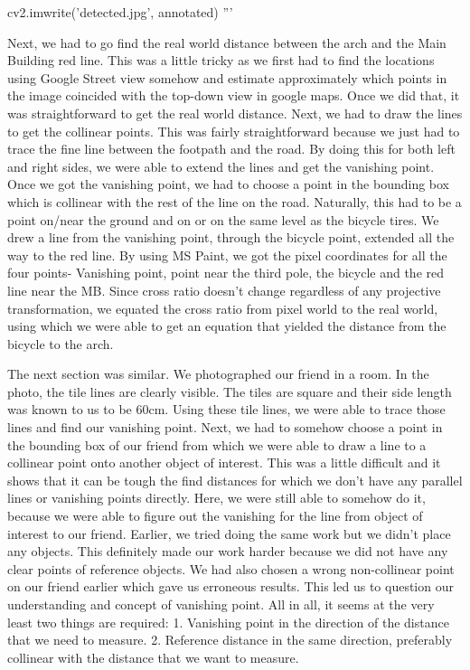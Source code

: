 cv2.imwrite('detected.jpg', annotated)
'''

Next, we had to go find the real world distance between the arch and the Main Building red line. This was a little tricky as we first had to find the locations using Google Street view somehow and estimate approximately which points in the image coincided with the top-down view in google maps.
Once we did that, it was straightforward to get the real world distance. 
Next, we had to draw the lines to get the collinear points. This was fairly straightforward because we just had to trace the fine line between the footpath and the road. By doing this for both left and right sides, we were able to extend the lines and get the vanishing point.
Once we got the vanishing point, we had to choose a point in the bounding box which is collinear with the rest of the line on the road. Naturally, this had to be a point on/near the ground and on or on the same level as the bicycle tires.
We drew a line from the vanishing point, through the bicycle point, extended all the way to the red line. By using MS Paint, we got the pixel coordinates for all the four points- Vanishing point, point near the third pole, the bicycle and the red line near the MB.
Since cross ratio doesn’t change regardless of any projective transformation, we equated the cross ratio from pixel world to the real world, using which we were able to get an equation that yielded the distance from the bicycle to the arch.

The next section was similar. We photographed our friend in a room. In the photo, the tile lines are clearly visible. The tiles are square and their side length was known to us to be 60cm.
Using these tile lines, we were able to trace those lines and find our vanishing point. Next, we had to somehow choose a point in the bounding box of our friend from which we were able to draw a line to a collinear point onto another object of interest. This was a little difficult and it shows that it can be tough the find distances for which we don’t have any parallel lines or vanishing points directly. Here, we were still able to somehow do it, because we were able to figure out the vanishing for the line from object of interest to our friend.
Earlier, we tried doing the same work but we didn’t place any objects. This definitely made our work harder because we did not have any clear points of reference objects.
We had also chosen a wrong non-collinear point on our friend earlier which gave us erroneous results. This led us to question our understanding and concept of vanishing point.
All in all, it seems at the very least two things are required:
1.	Vanishing point in the direction of the distance that we need to measure.
2.	Reference distance in the same direction, preferably collinear with the distance that we want to measure.
